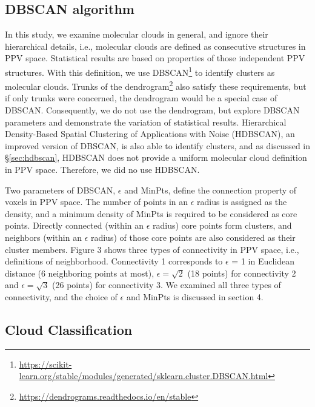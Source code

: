 \documentclass[twocolumn,trackchanges]{aastex701}
\begin{document}
\subsection{DBSCAN algorithm}

In this study, we examine molecular clouds in general, and ignore their hierarchical details, i.e., molecular clouds are defined as consecutive structures in PPV space. Statistical results are based on properties of those independent PPV structures. With this definition, we use DBSCAN\footnote{\href {https://scikit-learn.org/stable/modules/generated/sklearn.cluster.DBSCAN.html}{https://scikit-learn.org/stable/modules/generated/sklearn.cluster.DBSCAN.html}} to identify clusters as molecular clouds. Trunks of the  dendrogram\footnote{\href {https://dendrograms.readthedocs.io/en/stable}{https://dendrograms.readthedocs.io/en/stable}} also satisfy these requirements, but if only trunks were concerned, the dendrogram would be a special case of DBSCAN. Consequently, we do not use the dendrogram, but explore DBSCAN parameters and demonstrate the variation of statistical results. Hierarchical Density-Based Spatial Clustering of Applications with Noise (HDBSCAN), an improved version of DBSCAN, is also able to identify clusters, and as discussed in \S\ref{sec:hdbscan}, HDBSCAN does not provide a uniform molecular cloud definition in PPV space. Therefore, we did no use HDBSCAN.

Two parameters of DBSCAN, $\epsilon$ and MinPts, define the connection property of voxels in PPV space. The number of points in an $\epsilon$ radius is assigned as the density, and a minimum density of MinPts is required to be considered as core points. Directly connected (within an $\epsilon$ radius) core points form clusters, and neighbors (within an $\epsilon$ radius) of those core points are also considered as their cluster members. Figure 3 shows three types of connectivity in PPV space, i.e., definitions of neighborhood. Connectivity 1 corresponds to $\epsilon$ = 1 in Euclidean distance (6 neighboring points at most), $\epsilon = \sqrt{2}$ (18 points) for connectivity 2 and $\epsilon = \sqrt{3}$ (26 points) for connectivity 3. We examined all three types of connectivity, and the choice of $\epsilon$ and MinPts is discussed in section 4.

\subsection{Cloud Classification}
\end{document}
